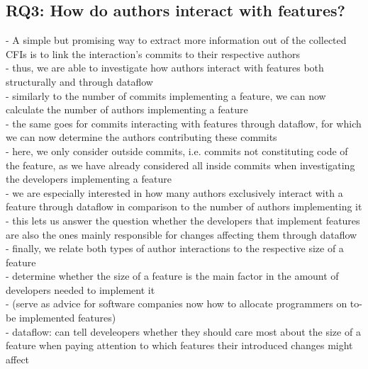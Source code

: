 \subsection*{\textbf{RQ3: How do authors interact with features?}}

- A simple but promising way to extract more information out of the collected CFIs is to link the interaction's commits to their respective authors \\
- thus, we are able to investigate how authors interact with features both structurally and through dataflow \\
- similarly to the number of commits implementing a feature, we can now calculate the number of authors implementing a feature \\
- the same goes for commits interacting with features through dataflow, for which we can now determine the authors contributing these commits \\
- here, we only consider outside commits, i.e. commits not constituting code of the feature, as we have already considered all inside commits when investigating the developers implementing a feature \\
- we are especially interested in how many authors exclusively interact with a feature through dataflow in comparison to the number of authors implementing it \\
- this lets us answer the question whether the developers that implement features are also the ones mainly responsible for changes affecting them through dataflow \\
- finally, we relate both types of author interactions to the respective size of a feature \\
- determine whether the size of a feature is the main factor in the amount of developers needed to implement it \\
- (serve as advice for software companies now how to allocate programmers on to-be implemented features) \\
- dataflow: can tell develeopers whether they should care most about the size of a feature when paying attention to which features their introduced changes might affect \\

